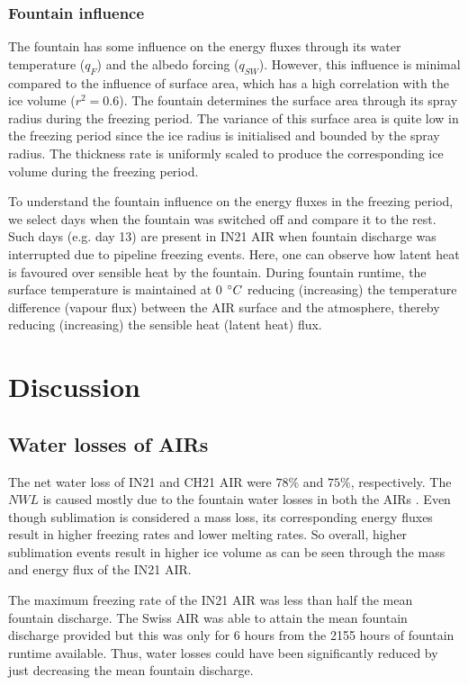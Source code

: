 \documentclass[utf8]{frontiersSCNS} %
\begin{document}
\subsubsection{Fountain influence}

The fountain has some influence on the energy fluxes through its water temperature ($q_{F}$) and the albedo forcing
($q_{SW}$). However, this influence is minimal compared to the influence of surface area, which has a high
correlation with the ice volume ($r^2=0.6$). The fountain determines the surface area through its spray radius
during the freezing period. The variance of this surface area is quite low in the freezing period since the ice
radius is initialised and bounded by the spray radius. The thickness rate is uniformly scaled to produce the
corresponding ice volume during the freezing period.

To understand the fountain influence on the energy fluxes in the freezing period, we select days when the fountain
was switched off and compare it to the rest. Such days (e.g. day 13) are present in IN21 AIR when fountain
discharge was interrupted due to pipeline freezing events. Here, one can observe how latent heat is favoured over
sensible heat by the fountain. During fountain runtime, the surface temperature is maintained at 0 $\degree C$
reducing (increasing) the temperature difference (vapour flux) between the AIR surface and the atmosphere, thereby
reducing (increasing) the sensible heat (latent heat) flux.

\section{Discussion}

\subsection{Water losses of AIRs}

The net water loss of IN21 and CH21 AIR were $78\%$ and $75\%$, respectively. The $NWL$ is caused mostly due to the
fountain water losses in both the AIRs . Even though sublimation is considered a mass loss, its corresponding
energy fluxes result in higher freezing rates and lower melting rates. So overall, higher sublimation events
result in higher ice volume as can be seen through the mass and energy flux of the IN21 AIR.

The maximum freezing rate of the IN21 AIR was less than half the mean fountain discharge. The Swiss AIR was able to
attain the mean fountain discharge provided but this was only for 6 hours from the 2155 hours of fountain runtime
available. Thus, water losses could have been significantly reduced by just decreasing the mean fountain discharge.
\end{document}
